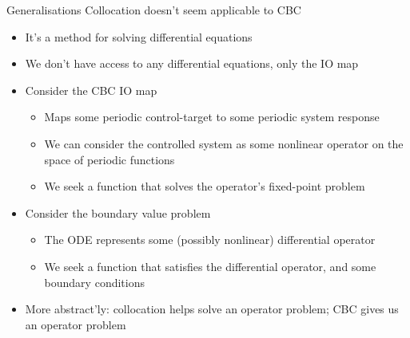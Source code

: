 \documentclass[presentation]{beamer}
\begin{document}
\begin{frame}[label={sec:org62c11af},plain]{Generalisations}
Collocation doesn't seem applicable to CBC
\begin{itemize}
\item It's a method for solving differential equations
\item We don't have access to any differential equations, only the IO map
\end{itemize}
\vfill
\begin{itemize}
\item Consider the CBC IO map
\begin{itemize}
\item Maps some periodic control-target to some periodic system response
\item We can consider the controlled system as some nonlinear operator on the space of periodic functions
\item We seek a function that solves the operator's fixed-point problem
\end{itemize}
\end{itemize}
\vfill
\begin{itemize}
\item Consider the boundary value problem
\begin{itemize}
\item The ODE represents some (possibly nonlinear) differential operator
\item We seek a function that satisfies the differential operator, and some boundary conditions
\end{itemize}
\end{itemize}
\vfill
\begin{itemize}
\item More abstract'ly: collocation helps solve an operator problem; CBC gives us an operator problem
\end{itemize}
\end{frame}
\end{document}
